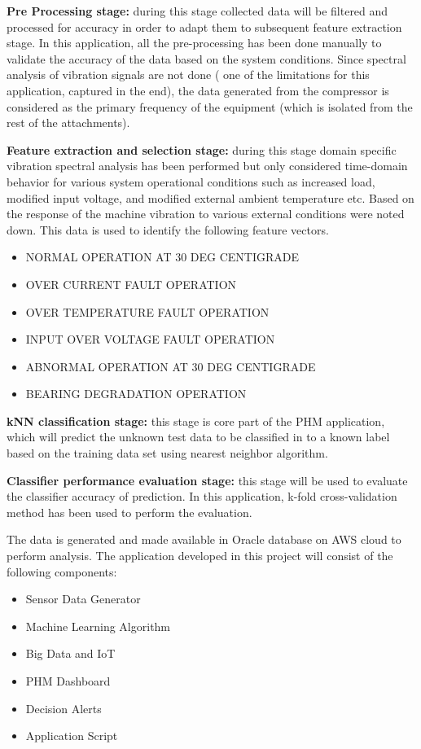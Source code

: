 \documentclass[sigconf]{acmart}
\begin{document}
\textbf{Pre Processing stage:} during this stage collected data will be filtered and processed for accuracy in order to adapt them to subsequent feature extraction stage. In this application, all the pre-processing has been done manually to validate the accuracy of the data based on the system conditions. Since spectral analysis of vibration signals are not done ( one of the limitations for this application, captured in the end), the data generated from the compressor is considered as the primary frequency of the equipment (which is isolated from the rest of the attachments).

\textbf{Feature extraction and selection stage:} during this stage domain specific vibration spectral analysis has been performed but only considered time-domain behavior for various system operational conditions such as increased load, modified input voltage, and modified external ambient temperature etc. Based on the response of the machine vibration to various external conditions were noted down. This data is used to identify the following feature vectors.
\begin{itemize}
\item NORMAL OPERATION AT 30 DEG CENTIGRADE
\item OVER CURRENT FAULT OPERATION
\item OVER TEMPERATURE FAULT OPERATION
\item INPUT OVER VOLTAGE FAULT OPERATION
\item ABNORMAL OPERATION AT 30 DEG CENTIGRADE
\item BEARING DEGRADATION OPERATION
\end{itemize}


\textbf{kNN classification stage:} this stage is core part of the PHM application, which will predict the unknown test data to be classified in to a known label based on the training data set using nearest neighbor algorithm.

\textbf{Classifier performance evaluation stage:} this stage will be used to evaluate the classifier accuracy of prediction. In this application, k-fold cross-validation method has been used to perform the evaluation.

The data is generated and made available in Oracle database on AWS cloud to perform analysis. The application developed in this project will consist of the following components:
\begin{itemize}
  \item Sensor Data Generator
  \item Machine Learning Algorithm
  \item Big Data and IoT
  \item PHM Dashboard
  \item Decision Alerts
  \item Application Script
 \end{itemize}
\end{document}
